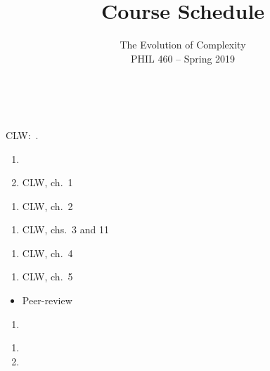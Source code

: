 \documentclass{article}
\author{\large The Evolution of Complexity\\ \normalsize PHIL 460 -- Spring 2019}
\date{}
\title{\bf Course Schedule\vspace{-0.5em}}
\begin{document}
\maketitle
\onehalfspacing{}





\ \newline{}

CLW:\ .


\dia{}
\NR{}

\dia{}
\begin{enumerate}
\item {}
\item CLW, ch.~1
\end{enumerate}

\dia{}
\begin{enumerate}
\item CLW, ch.~2
\end{enumerate}

\dia{}
\begin{enumerate}
\item CLW, chs.~3 and 11
\end{enumerate}

\dia{}
\begin{enumerate}
\item CLW, ch.~4
\end{enumerate}
\dia{}
\begin{enumerate}
\item CLW, ch.~5
\end{enumerate}

\dia{}
\begin{itemize}
\item[ ] Peer-review
\end{itemize}

\dia{}
\begin{enumerate}
\item {}
\end{enumerate}

\dia{}
\begin{enumerate}
\item {}
\item {}
\end{enumerate}
\end{document}
